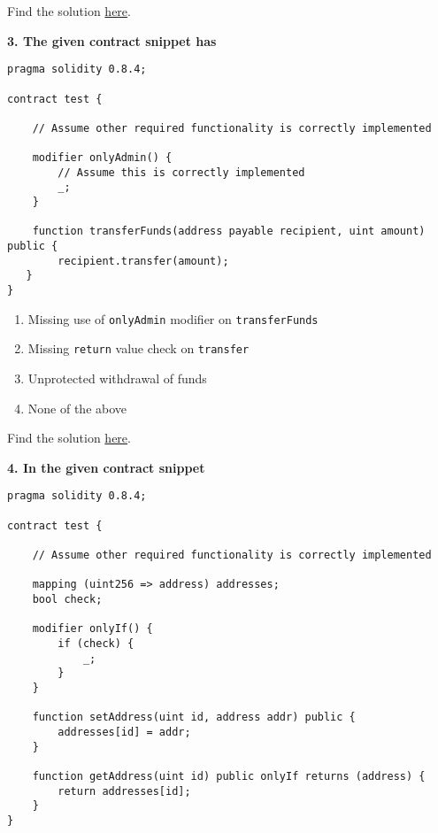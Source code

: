 Find the solution \hyperref[sec:exam4_q2]{here}.\\

\pagebreak

\textbf{3. The given contract snippet has}

\begin{lstlisting}[language=Solidity, style=solStyle]
pragma solidity 0.8.4;

contract test {

    // Assume other required functionality is correctly implemented

    modifier onlyAdmin() {
        // Assume this is correctly implemented
        _;
    }

    function transferFunds(address payable recipient, uint amount) public {
        recipient.transfer(amount);
   }
}
\end{lstlisting}

\begin{enumerate}[label=\Alph*.]
    \item Missing use of \verb|onlyAdmin| modifier on \verb|transferFunds|
    \item Missing \verb|return| value check on \verb|transfer|
    \item Unprotected withdrawal of funds
    \item None of the above
\end{enumerate}

Find the solution \hyperref[sec:exam4_q3]{here}.\\

\pagebreak

\textbf{4. In the given contract snippet}

\begin{lstlisting}[language=Solidity, style=solStyle]
pragma solidity 0.8.4;

contract test {

    // Assume other required functionality is correctly implemented

    mapping (uint256 => address) addresses;
    bool check;

    modifier onlyIf() {
        if (check) {
            _;
        }
    }

    function setAddress(uint id, address addr) public {
        addresses[id] = addr;
    }

    function getAddress(uint id) public onlyIf returns (address) {
        return addresses[id];
    }
}
\end{lstlisting}

